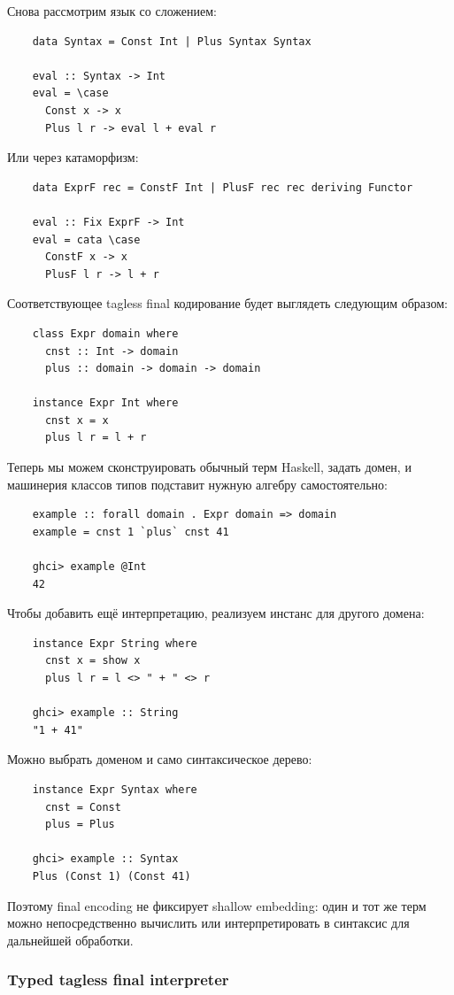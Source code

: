 Снова рассмотрим язык со сложением:
\begin{verbatim}
    data Syntax = Const Int | Plus Syntax Syntax

    eval :: Syntax -> Int
    eval = \case
      Const x -> x
      Plus l r -> eval l + eval r
\end{verbatim}
Или через катаморфизм:
\begin{verbatim}
    data ExprF rec = ConstF Int | PlusF rec rec deriving Functor

    eval :: Fix ExprF -> Int
    eval = cata \case
      ConstF x -> x
      PlusF l r -> l + r
\end{verbatim}
Соответствующее tagless final кодирование будет выглядеть следующим образом:
\begin{verbatim}
    class Expr domain where
      cnst :: Int -> domain
      plus :: domain -> domain -> domain

    instance Expr Int where
      cnst x = x
      plus l r = l + r
\end{verbatim}

Теперь мы можем сконструировать обычный терм Haskell, задать домен, и машинерия классов типов подставит нужную алгебру самостоятельно:
\begin{verbatim}
    example :: forall domain . Expr domain => domain
    example = cnst 1 `plus` cnst 41

    ghci> example @Int
    42
\end{verbatim}

Чтобы добавить ещё интерпретацию, реализуем инстанс для другого домена:
\begin{verbatim}
    instance Expr String where
      cnst x = show x
      plus l r = l <> " + " <> r

    ghci> example :: String
    "1 + 41"
\end{verbatim}

Можно выбрать доменом и само синтаксическое дерево:
\begin{verbatim}
    instance Expr Syntax where
      cnst = Const
      plus = Plus

    ghci> example :: Syntax
    Plus (Const 1) (Const 41)
\end{verbatim}
Поэтому final encoding не фиксирует shallow embedding: один и тот же терм можно непосредственно вычислить или интерпретировать в синтаксис для дальнейшей обработки.

\subsubsection{Typed tagless final interpreter}

